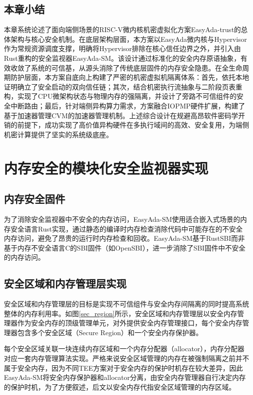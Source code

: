 \documentclass[master, vlined, review]{DissertUESTC}
\begin{document}
	\section{本章小结}
	本章系统论述了面向端侧场景的RISC-V微内核机密虚拟化方案EasyAda-trust的总体架构与核心安全机制。在底层架构层面，本方案以EasyAda微内核与Hypervisor作为常规资源调度支撑，明确将Hypervisor排除在核心信任边界之外，并引入由Rust重构的安全监视器EasyAda-SM。该设计通过标准化的安全内存原语抽象，有效收敛了系统的可信基，从源头消除了传统底层固件的内存安全隐患。在全生命周期防护层面，本方案自底向上构建了严密的机密虚拟机隔离体系：首先，依托本地证明确立了安全启动的双向信任链；其次，结合机密执行流抽象与二阶段页表重构，实现了CPU微架构状态与物理内存的强隔离，并设计了旁路不可信组件的安全中断路由；最后，针对端侧异构算力需求，方案融合IOPMP硬件扩展，构建了基于加速器管理CVM的加速器管理机制。上述综合设计在规避高昂软件密码学开销的前提下，成功实现了高价值异构硬件在多执行域间的高效、安全复用，为端侧机密计算提供了坚实的系统级底座。

	\chapter{内存安全的模块化安全监视器实现}
	
	\section{内存安全固件}
	为了消除安全监视器中不安全的内存访问，EasyAda-SM使用适合嵌入式场景的内存安全语言Rust实现，通过静态的编译时内存检查消除代码中可能存在的不安全内存访问，避免了昂贵的运行时内存检查和回收。EasyAda-SM基于RustSBI而非基于内存不安全语言C的SBI固件（如OpenSBI），进一步消除了SBI固件中不安全的内存访问。
	
	\section{安全区域和内存管理层实现}
	安全区域和内存管理层的目标是实现不可信组件与安全内存间隔离的同时提高系统整体的内存利用率。如图\ref{sec_region}所示，安全区域和内存管理层以安全内存管理器作为安全内存的顶级管理单元，对外提供安全内存管理接口，每个安全内存管理器包含多个安全区域（Secure Region）和一个安全内存保护器。
	
	每个安全区域关联一块连续内存区域和一个内存分配器（allocator），内存分配器对应一套内存管理算法实现。严格来说安全区域管理的内存在被强制隔离之前并不属于安全内存，因为不同TEE方案对于安全内存的保护时机存在较大差异，因此EasyAda-SM将安全内存保护器和allocator分离，由安全内存管理器自行决定内存的保护时机，为了方便叙述，后文以安全内存代指安全区域管理的内存区域。
	
\end{document}
